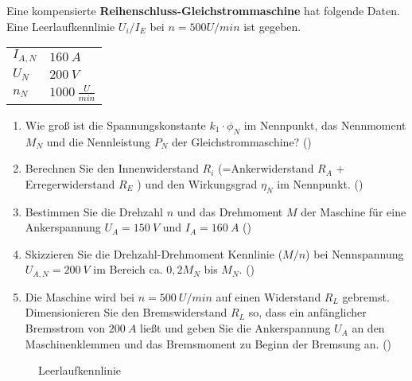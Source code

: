 \begin{question}[topic=gsm,name={18.1.2017},type=exam,tags={20170118}]
	Eine kompensierte \textbf{Reihenschluss-Gleichstrommaschine} hat folgende Daten. Eine Leerlaufkennlinie $U_i/I_E$ bei $n=500 U/min$ ist gegeben.\\
	\begin{tabular}{L{2cm}l}
		$I_{A,N}$ \dotfill &$160~A$\\
		$U_{N}$ \dotfill & $200~V$ \\
		$n_N$ \dotfill & $1000~\frac{U}{min}$\\
	\end{tabular}
	\begin{enumerate}
		\item Wie groß ist die Spannungskonstante $k_1 \cdot \phi_N$ im Nennpunkt, das Nennmoment $M_N$ und die Nennleistung $P_N$ der Gleichstrommaschine? ()
		\item Berechnen Sie den Innenwiderstand $R_i$ (=Ankerwiderstand $R_A$ + Erregerwiderstand $R_E$ ) und den Wirkungsgrad $\eta_N$ im Nennpunkt. ()
		\item Bestimmen Sie die Drehzahl $n$ und das Drehmoment $M$ der Maschine für eine Ankerspannung $U_A =150~V$ und $I_A = 160~A$ ()
		\item Skizzieren Sie die Drehzahl-Drehmoment Kennlinie ($M/n$) bei Nennspannung $U_{A,N}=200~V$ im Bereich ca. $0,2M_N$ bis $M_N$. ()
		\item Die Maschine wird bei $n=500~U/min$ auf einen Widerstand $R_L$ gebremst. Dimensionieren Sie den Bremswiderstand $R_L$ so, dass ein anfänglicher Bremsstrom von $200~A$ ließt und geben Sie die Ankerspannung $U_A$ an den Maschinenklemmen und das Bremsmoment zu Beginn der Bremsung an. ()
	\end{enumerate}
	\begin{figure}[H]
		\caption{Leerlaufkennlinie} \label{fig:20170118}
	\end{figure}
\end{question}
\begin{solution}
	
\end{solution}